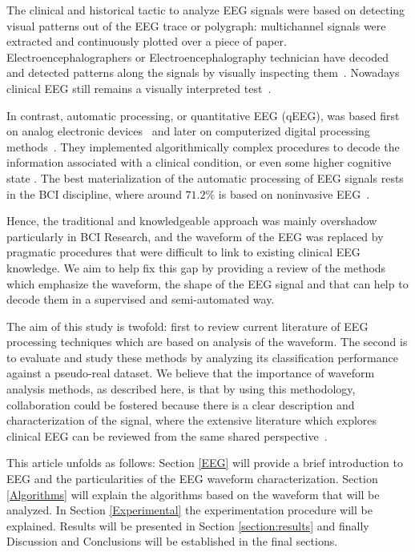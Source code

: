 \documentclass[brainsci,article,submit,moreauthors,pdftex,10pt,a4paper]{mdpi}
\begin{document}
The clinical and historical tactic to analyze EEG signals were based on detecting visual patterns out of the EEG trace or polygraph\citep{Hartman2005}: multichannel signals were extracted and continuously plotted over a piece of paper. Electroencephalographers or Electroencephalography technician have decoded and detected patterns along the signals by visually inspecting them~\citep{Schomer2010}.   Nowadays clinical EEG still remains a visually interpreted test~\citep{Hartman2005}.

In contrast, automatic processing, or quantitative EEG (qEEG), was based first on analog electronic devices~\citep{Jestico1977} and later on computerized digital processing methods~\citep{Jansen1991}.  They implemented algorithmically complex procedures to decode the information associated with a clinical condition, or even some higher cognitive state \citep{Yuste2017}.  The best materialization of the automatic processing of EEG signals rests in the BCI discipline, where around $71.2\%$ is based on noninvasive EEG~\citep{Guger2017}.  


Hence, the traditional and knowledgeable approach was mainly overshadow particularly in BCI Research, and the waveform of the EEG was replaced by pragmatic procedures that were difficult to link to existing clinical EEG knowledge.  We aim to help fix this gap by providing a review of the methods which emphasize the waveform, the shape of the EEG signal and that can help to decode them in a supervised and semi-automated way.

The aim of this study is twofold: first to review current literature of EEG processing techniques which are based on analysis of the waveform.  The second is to evaluate and study these methods by analyzing its classification performance against a pseudo-real dataset. We believe that the importance of waveform analysis methods, as described here, is that by using this methodology, collaboration could be fostered because there is a clear description and characterization of the signal, where the extensive literature which explores clinical EEG can be reviewed from the same shared perspective~\citep{Nijboer2009,Wei2017}. 

This article unfolds as follows: Section \ref{EEG} will provide a brief introduction to EEG and the particularities of the EEG waveform characterization.  Section \ref{Algorithms} will explain the algorithms based on the waveform that will be analyzed.  In Section \ref{Experimental} the experimentation procedure will be explained.  Results will be presented in Section \ref{section:results} and finally Discussion and Conclusions will be established in the final sections.
\end{document}
